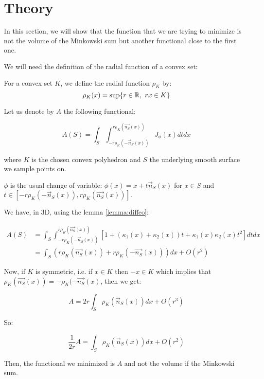 
\section{Theory}

In this section, we will show that the function that we are trying to minimize
is not the volume of the Minkowski sum but another functional close to the
first one.

We will need the definition of the radial function of a convex set:

\begin{definition}
    For a convex set $ K $, we define the radial function $ \rho_K $ by:
    $$ \rho_K(x) = \sup \{ r \in \mathbb{R},~rx \in K \} $$
\end{definition}

Let us denote by $ A $ the following functional:

$$ A(S) = \int_S \int_{-r \rho_K(-\vec{n}_S(x))}^{r \rho_K(\vec{n_S}(x))} J_\phi(x)
dt dx $$

where $ K $ is the chosen convex polyhedron and $ S $ the underlying smooth
surface we sample points on.

$ \phi $ is the usual change of variable: $ \phi(x) = x + t \vec{n}_S(x) $ for $
x \in S $ and $ t \in [-r \rho_K(-\vec{n}_S(x)), r \rho_K(\vec{n_S}(x)) ] $.

We have, in 3D, using the lemma \ref{lemma:diffeo}:

\begin{align*}
    A(S) &= \int_S \int_{-r \rho_K(-\vec{n}_S(x))}^{r \rho_K(\vec{n_S}(x))}
    \left[ 1 + (\kappa_1(x) + \kappa_2(x)) t + \kappa_1(x) \kappa_2(x) t^2
    \right] dt dx \\
    &= \int_S (r \rho_K(\vec{n_S}(x)) + r \rho_K(-\vec{n_S}(x))) dx + O(r^2)
\end{align*}

Now, if $ K $ is symmetric, i.e. if $ x \in K $ then $ -x \in K $ which implies
that $ \rho_K(\vec{n_S}(x)) = -\rho_K(-\vec{n_S}(x) $, then we get:

$$ A = 2r \int_S \rho_K(\vec{n}_S(x)) dx + O(r^3) $$

So:

$$ \frac{1}{2r} A = \int_S \rho_K(\vec{n}_S(x)) dx + O(r^2) $$

Then, the functional we minimized is $ A $ and not the volume if the Minkowski
sum.

